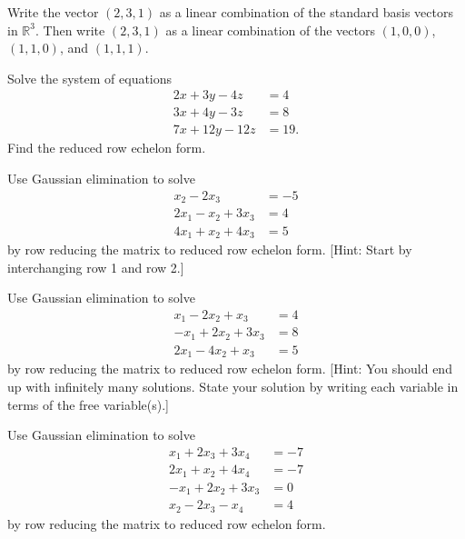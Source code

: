 {%
\begin{problem}
 Write the vector $(2,3,1)$ as a linear combination of the standard basis vectors in $\mathbb{R}^3$.  Then write $(2,3,1)$ as a linear combination of the vectors $(1,0,0)$, $(1,1,0)$, and $(1,1,1)$.  
\end{problem}


\begin{problem}
 Solve the system of equations 
\begin{align*}
  2x+3y-4z&=4\\  
  3x+4y-3z&=8\\  
  7x+12y-12z&=19.  
\end{align*}
Find the reduced row echelon form.  
\end{problem}

\begin{problem}
Use Gaussian elimination to solve 
 $$
\begin{array}{rl}
  x_2 -2x_3 &= -5 \\
 2x_1 -x_2 + 3x_3 &= 4 \\
 4x_1 +x_2 + 4x_3 &= 5
\end{array}
$$
by row reducing the matrix to reduced row echelon form.
[Hint: Start by interchanging row 1 and row 2.] 
\end{problem}

\begin{problem}
Use Gaussian elimination to solve 
 $$
\begin{array}{rl}
 x_1 -2x_2 +x_3 &= 4 \\
 -x_1 + 2x_2 + 3x_3 &= 8 \\
 2x_1  -4x_2 +x_3 &= 5
\end{array}
$$
by row reducing the matrix to reduced row echelon form.
[Hint: You should end up with infinitely many solutions. State your solution by writing each variable in terms of the free variable(s).]
\end{problem}

\begin{problem}
Use Gaussian elimination to solve 
 $$
\begin{array}{rl}
 x_1 + 2x_3 + 3x_4 &= -7 \\
 2x_1 +x_2 + 4x_4 &= -7 \\
 -x_1 + 2x_2 + 3x_3  &= 0 \\
 x_2  -2x_3  -x_4 &= 4
\end{array}
$$
by row reducing the matrix to reduced row echelon form.
\end{problem}



}
